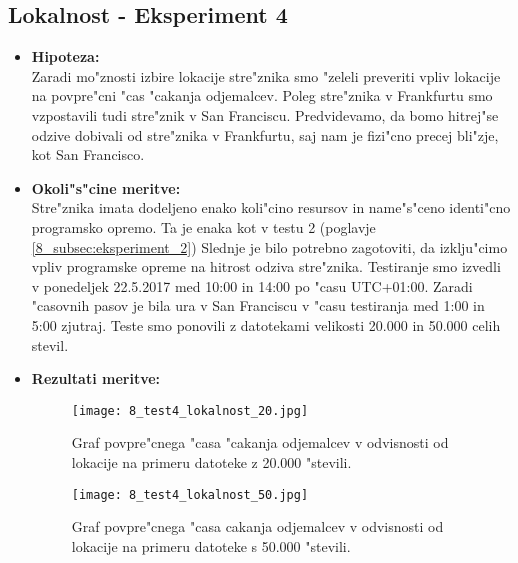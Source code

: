 \newpage
\subsection{Lokalnost - Eksperiment 4}
\label{8_subsec:eksperiment_4}
\begin{itemize}
	\item \textbf{Hipoteza: }  \\
		Zaradi mo"znosti izbire lokacije stre"znika smo "zeleli preveriti vpliv lokacije na povpre"cni "cas "cakanja odjemalcev. Poleg stre"znika v Frankfurtu smo vzpostavili tudi stre"znik v San Franciscu. Predvidevamo, da bomo hitrej"se odzive dobivali od stre"znika v Frankfurtu, saj nam je fizi"cno precej bli"zje, kot San Francisco.
	\item \textbf{Okoli"s"cine meritve: } \\
		Stre"znika imata dodeljeno enako koli"cino resursov in name"s"ceno identi"cno programsko opremo. Ta je enaka kot v testu 2 (poglavje \ref{8_subsec:eksperiment_2}) Slednje je bilo potrebno zagotoviti, da izklju"cimo vpliv programske opreme na hitrost odziva stre"znika. Testiranje smo izvedli v ponedeljek 22.5.2017 med 10:00 in 14:00 po "casu UTC+01:00. Zaradi "casovnih pasov je bila ura v San Franciscu v "casu testiranja med 1:00 in 5:00 zjutraj. Teste smo ponovili z datotekami velikosti 20.000 in 50.000 celih stevil.

 	\item \textbf{Rezultati meritve: }  \\
		\begin{figure}[h]
  		\centering
  		  \texttt{[image: 8\_test4\_lokalnost\_20.jpg]}
  		\caption{Graf povpre"cnega "casa "cakanja odjemalcev v odvisnosti od lokacije na primeru datoteke z 20.000 "stevili.}
  		\label{8_graf_lokalnost_20}
		\end{figure}

		\begin{figure}[h]
  		\centering
  		  \texttt{[image: 8\_test4\_lokalnost\_50.jpg]}
  		\caption{Graf povpre"cnega "casa cakanja odjemalcev v odvisnosti od lokacije na primeru datoteke s 50.000 "stevili.}
  		\label{8_graf_lokalnost_50}
		\end{figure}


\end{itemize}
